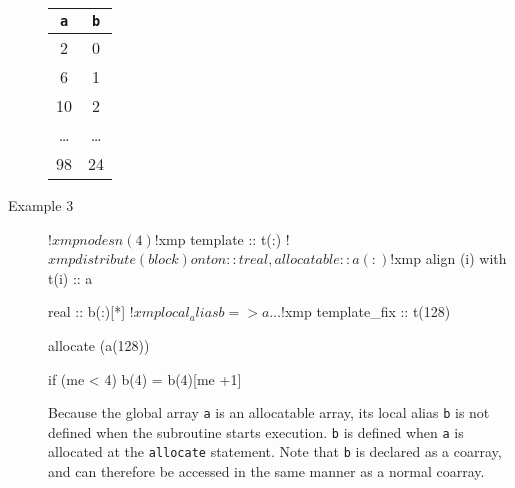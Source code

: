 \begin{description}
\begin{center}
\begin{tabular}{|c|c|}\hline
{\tt a}      & {\tt b} \\ \hline\hline
2            & 0       \\ \hline
6            & 1       \\ \hline
10           & 2       \\ \hline
\dots        & \dots   \\ \hline
98           & 24      \\ \hline
\end{tabular}
\end{center}

\item[Example 3]
\hspace{\hsize}
\begin{XFexample}
!$xmp nodes n(4)
!$xmp template :: t(:)
!$xmp distribute (block) onto n :: t

      real, allocatable :: a(:)
!$xmp align (i) with t(i) :: a

      real :: b(:)[*]
!$xmp local_alias b => a

      …

!$xmp template_fix :: t(128)

      allocate (a(128))

      if (me < 4) b(4) = b(4)[me +1]
\end{XFexample}

Because the global array {\tt a} is an allocatable array, its local alias
{\tt b} is not defined when the subroutine starts execution. {\tt b} is
defined when {\tt a} is allocated at the {\tt allocate}
statement. Note that {\tt b} is declared as a coarray, and can therefore
be accessed in the same manner as a normal coarray.

\end{description}


